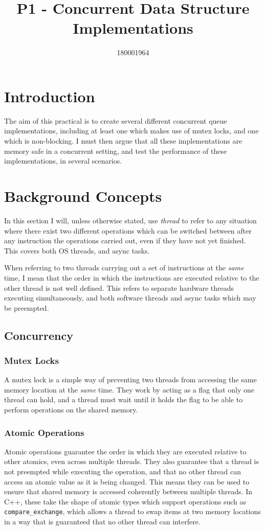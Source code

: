 \documentclass{article}
\title{P1 - Concurrent Data Structure Implementations}
\author{180001964}
\begin{document}
\maketitle

\section{Introduction}
The aim of this practical is to create several different concurrent queue
implementations, including at least one which makes use of mutex locks, and one
which is non-blocking. I must then argue that all these implementations are
memory safe in a concurrent setting, and test the performance of these
implementations, in several scenarios.

\section{Background Concepts}
In this section I will, unless otherwise stated, use \textit{thread} to refer to
any situation where there exist two different operations which can be switched
between after any instruction the operations carried out, even if they have not yet
finished. This covers both OS threads, and async tasks. 

When referring to two threads carrying out a set of instructions at the
\textit{same} time, I mean that the order in which the instructions are executed
relative to the other thread is not well defined. This refers to separate
hardware threads executing simultaneously, and both software threads and async tasks
which may be preempted.

\subsection{Concurrency}
\subsubsection{Mutex Locks}
A mutex lock is a simple way of preventing two threads from accessing the same
memory location at the \textit{same} time. They work by acting as a flag that
only one thread can hold, and a thread must wait until it holds the flag to
be able to perform operations on the shared memory.

\subsubsection{Atomic Operations}
Atomic operations guarantee the order in which they are executed relative to
other atomics, even across multiple threads. They also guarantee that a thread
is not preempted while executing the operation, and that no other thread can
access an atomic value as it is being changed. This means they can be used to
ensure that shared memory is accessed coherently between multiple threads. In
C++, these take the shape of atomic types which support operations such as
\verb|compare_exchange|, which allows a thread to swap items at two memory
locations in a way that is guaranteed that no other thread can interfere.
\end{document}
